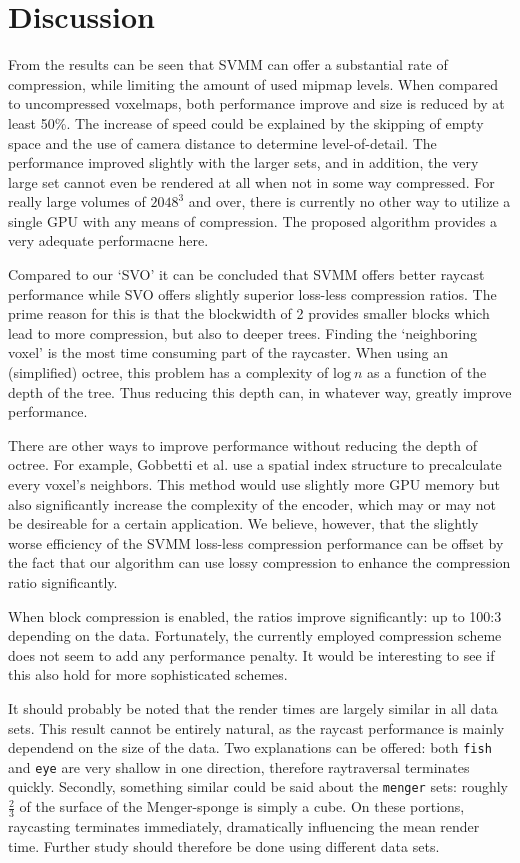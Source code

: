 \chapter{Discussion} \label{ch:discussion}
%
From the results can be seen that SVMM can offer a substantial rate of compression, while limiting the amount of used mipmap levels. When compared to uncompressed voxelmaps, both performance improve and size is reduced by at least 50\%. The increase of speed could be explained by the skipping of empty space and the use of camera distance to determine level-of-detail. The performance improved slightly with the larger sets, and in addition, the very large set cannot even be rendered at all when not in some way compressed. For really large volumes of $2048^3$ and over, there is currently no other way to utilize a single GPU with any means of compression. The proposed algorithm provides a very adequate performacne here.

Compared to our `SVO' it can be concluded that SVMM offers better raycast performance while SVO offers slightly superior loss-less compression ratios. The prime reason for this is that the blockwidth of 2 provides smaller blocks which lead to more compression, but also to deeper trees. Finding the `neighboring voxel' is the most time consuming part of the raycaster. When using an (simplified) octree, this problem has a complexity of $\mathrm{log} \ n$ as a function of the depth of the tree. Thus reducing this depth can, in whatever way, greatly improve performance.

There are other ways to improve performance without reducing the depth of octree. For example, Gobbetti et al. \cite{gobbetti08} use a spatial index structure to precalculate every voxel's neighbors. This method would use slightly more GPU memory but also significantly increase the complexity of the encoder, which may or may not be desireable for a certain application. We believe, however, that the slightly worse efficiency of the SVMM loss-less compression performance can be offset by the fact that our algorithm can use lossy compression to enhance the compression ratio significantly.

When block compression is enabled, the ratios improve significantly: up to 100:3 depending on the data. Fortunately, the currently employed compression scheme does not seem to add any performance penalty. It would be interesting to see if this also hold for more sophisticated schemes.

It should probably be noted that the render times are largely similar in all data sets. This result cannot be entirely natural, as the raycast performance is mainly dependend on the size of the data. Two explanations can be offered: both \texttt{fish} and \texttt{eye} are very shallow in one direction, therefore raytraversal terminates quickly. Secondly, something similar could be said about the \texttt{menger} sets: roughly $\frac{2}{3}$ of the surface of the Menger-sponge is simply a cube. On these portions, raycasting terminates immediately, dramatically influencing the mean render time. Further study should therefore be done using different data sets.
%
